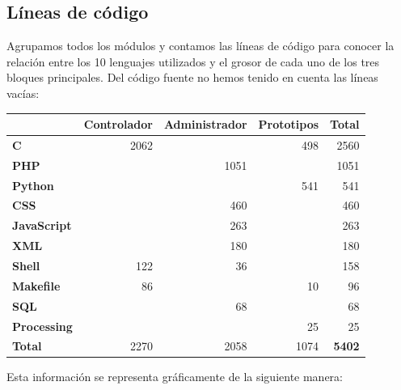 \smallskip

\subsection{Líneas de código}

Agrupamos todos los módulos y contamos las líneas de código para conocer la relación entre los 10 lenguajes utilizados y el grosor de cada uno de los tres bloques principales. Del código fuente no hemos tenido en cuenta las líneas vacías:

\smallskip

\begin{center}
	\begin{tabular}{|l|r|r|r|r|}
		\hline & \textbf{Controlador} & \textbf{Administrador} & \textbf{Prototipos} & \textbf{Total} \\ 
		\hline \textbf{C} & 2062 & & 498 & 2560 \\
		\hline \textbf{\acrshort{PHP}} & & 1051 & & 1051 \\
		\hline \textbf{Python} &  &  & 541 & 541 \\
		\hline \textbf{CSS} & & 460 & & 460 \\
		\hline \textbf{JavaScript} & & 263 & & 263 \\
		\hline \textbf{XML} & & 180 & & 180 \\
		\hline \textbf{Shell} & 122 & 36 & & 158 \\
		\hline \textbf{Makefile} & 86 &  & 10 & 96 \\
		\hline \textbf{SQL} & & 68 & & 68 \\
		\hline \textbf{Processing} & & & 25 & 25 \\
		\hline \textbf{Total} & 2270 & 2058 & 1074 & \textbf{5402} \\
		\hline 
	\end{tabular}
	\smallskip
\end{center}

\smallskip

Esta información se representa gráficamente de la siguiente manera:

\smallskip

